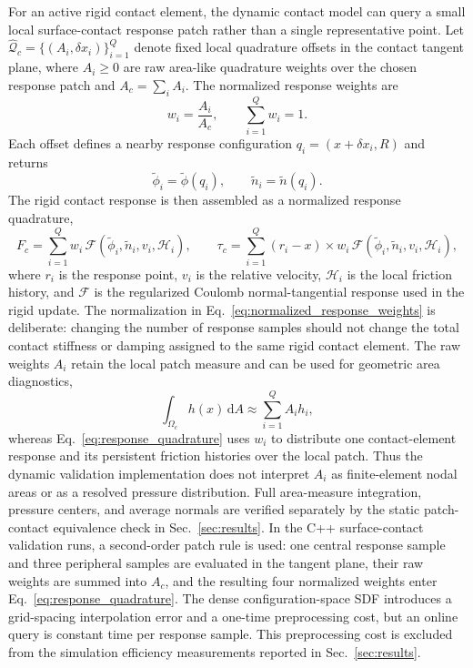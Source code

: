 \documentclass[preprint,12pt]{elsarticle}
\newcommand{\dd}{\mathrm{d}}
\begin{document}
For an active rigid contact element, the dynamic contact model can query a small local surface-contact response patch rather than a single representative point. Let $\widehat{\mathcal Q}_c=\{(A_i,\delta x_i)\}_{i=1}^{Q}$ denote fixed local quadrature offsets in the contact tangent plane, where $A_i\ge0$ are raw area-like quadrature weights over the chosen response patch and $A_c=\sum_i A_i$. The normalized response weights are
\begin{equation}
    w_i=\frac{A_i}{A_c},\qquad \sum_{i=1}^{Q}w_i=1 .
    \label{eq:normalized_response_weights}
\end{equation}
Each offset defines a nearby response configuration $q_i=(x+\delta x_i,R)$ and returns
\begin{equation}
    \tilde\phi_i=\tilde\phi(q_i),
    \qquad
    \tilde n_i=\tilde n(q_i).
    \label{eq:response_patch_samples}
\end{equation}
The rigid contact response is then assembled as a normalized response quadrature,
\begin{equation}
    F_c=\sum_{i=1}^{Q} w_i\,\mathcal F(\tilde\phi_i,\tilde n_i,v_i,\mathcal H_i),
    \qquad
    \tau_c=\sum_{i=1}^{Q} (r_i-x)\times
    w_i\,\mathcal F(\tilde\phi_i,\tilde n_i,v_i,\mathcal H_i),
    \label{eq:response_quadrature}
\end{equation}
where $r_i$ is the response point, $v_i$ is the relative velocity, $\mathcal H_i$ is the local friction history, and $\mathcal F$ is the regularized Coulomb normal-tangential response used in the rigid update. The normalization in Eq.~\eqref{eq:normalized_response_weights} is deliberate: changing the number of response samples should not change the total contact stiffness or damping assigned to the same rigid contact element. The raw weights $A_i$ retain the local patch measure and can be used for geometric area diagnostics,
\begin{equation}
    \int_{\Omega_c} h(x)\,\dd A \approx \sum_{i=1}^{Q} A_i h_i ,
    \label{eq:area_measure_quadrature}
\end{equation}
whereas Eq.~\eqref{eq:response_quadrature} uses $w_i$ to distribute one contact-element response and its persistent friction histories over the local patch. Thus the dynamic validation implementation does not interpret $A_i$ as finite-element nodal areas or as a resolved pressure distribution. Full area-measure integration, pressure centers, and average normals are verified separately by the static patch-contact equivalence check in Sec.~\ref{sec:results}. In the C++ surface-contact validation runs, a second-order patch rule is used: one central response sample and three peripheral samples are evaluated in the tangent plane, their raw weights are summed into $A_c$, and the resulting four normalized weights enter Eq.~\eqref{eq:response_quadrature}. The dense configuration-space SDF introduces a grid-spacing interpolation error and a one-time preprocessing cost, but an online query is constant time per response sample. This preprocessing cost is excluded from the simulation efficiency measurements reported in Sec.~\ref{sec:results}.
\end{document}
